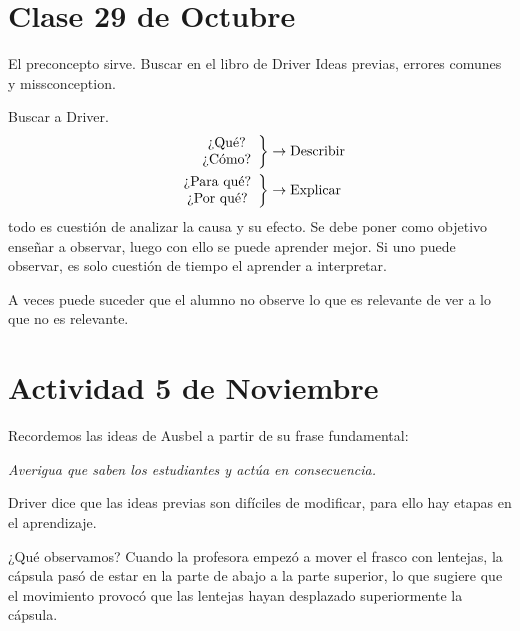 \documentclass[12pt]{report}
\newcounter{it}
\theoremstyle{largebreak}
\begin{document}
    \section{Clase 29 de Octubre}

    El preconcepto sirve. Buscar en el libro de Driver Ideas previas, errores comunes y missconception.

    Buscar a Driver.
    \begin{equation*}
        \begin{split}
            \left. \begin{array}{c}
                \textup{¿Qué?} \\
                \textup{¿Cómo?} \\
            \end{array}\right\} & \rightarrow \textup{Describir} \\
            \left. \begin{array}{c}
                \textup{¿Para qué?} \\
                \textup{¿Por qué?} \\
            \end{array}\right\} & \rightarrow \textup{Explicar}
        \end{split}
    \end{equation*}
    todo es cuestión de analizar la causa y su efecto. Se debe poner como objetivo enseñar a observar, luego con ello se puede aprender mejor. Si uno puede observar, es solo cuestión de tiempo el aprender a interpretar.

    A veces puede suceder que el alumno no observe lo que es relevante de ver a lo que no es relevante.

    \section{Actividad 5 de Noviembre}

    Recordemos las ideas de Ausbel a partir de su frase fundamental:

    \begin{center}
        \textit{Averigua que saben los estudiantes y actúa en consecuencia.}
    \end{center}

    Driver dice que las ideas previas son difíciles de modificar, para ello hay etapas en el aprendizaje.

    ¿Qué observamos? Cuando la profesora empezó a mover el frasco con lentejas, la cápsula pasó de estar en la parte de abajo a la parte superior, lo que sugiere que el movimiento provocó que las lentejas hayan desplazado superiormente la cápsula.
\end{document}
